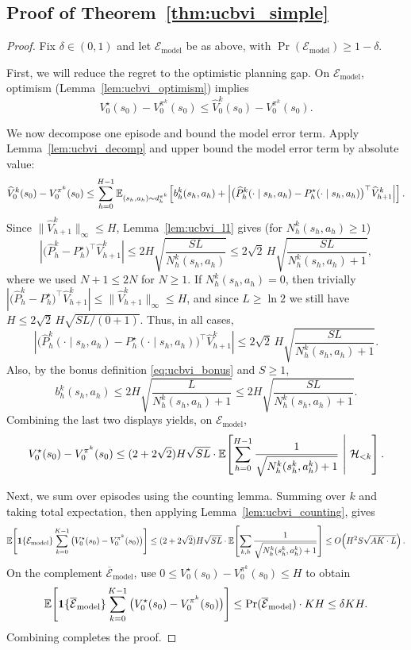 \subsection{Proof of Theorem~\ref{thm:ucbvi_simple}}

\begin{proof}
Fix $\delta\in(0,1)$ and let $\mathcal{E}_{\mathrm{model}}$ be as above, with
$\Pr(\mathcal{E}_{\mathrm{model}})\ge 1-\delta$.

First, we will reduce the regret to the optimistic planning gap.
On $\mathcal{E}_{\mathrm{model}}$, optimism (Lemma~\ref{lem:ucbvi_optimism}) implies
\[
V_0^\star(s_0) - V_0^{\pi^k}(s_0)
\le
\widehat V_0^k(s_0) - V_0^{\pi^k}(s_0).
\]

We now decompose one episode and bound the model error term.
Apply Lemma~\ref{lem:ucbvi_decomp} and upper bound the model error term by absolute value:
\[
\widehat V_0^k(s_0) - V_0^{\pi^k}(s_0)
\le
\sum_{h=0}^{H-1}\mathbb{E}_{(s_h,a_h)\sim d_h^{\pi^k}}\!\left[
b_h^k(s_h,a_h) + \left|\big(\widehat P_h^k(\cdot\mid s_h,a_h)-P_h^\star(\cdot\mid s_h,a_h)\big)^\top \widehat V_{h+1}^k\right|
\right].
\]
Since $\|\widehat V_{h+1}^k\|_\infty\le H$, Lemma~\ref{lem:ucbvi_l1} gives (for $N_h^k(s_h,a_h)\ge 1$)
\[
\left|\big(\widehat P_h^k-P_h^\star\big)^\top \widehat V_{h+1}^k\right|
\le
2H\sqrt{\frac{S L}{N_h^k(s_h,a_h)}}
\le
2\sqrt{2}\,H\sqrt{\frac{S L}{N_h^k(s_h,a_h)+1}},
\]
where we used $N+1\le 2N$ for $N\ge 1$.
If $N_h^k(s_h,a_h)=0$, then trivially
$\left|\big(\widehat P_h^k-P_h^\star\big)^\top \widehat V_{h+1}^k\right|\le \|\widehat V_{h+1}^k\|_\infty\le H$,
and since $L\ge \ln 2$ we still have
$H\le 2\sqrt{2}\,H\sqrt{SL/(0+1)}$.
Thus, in all cases,
\[
\left|\big(\widehat P_h^k(\cdot\mid s_h,a_h)-P_h^\star(\cdot\mid s_h,a_h)\big)^\top \widehat V_{h+1}^k\right|
\le
2\sqrt{2}\,H\sqrt{\frac{S L}{N_h^k(s_h,a_h)+1}}.
\]
Also, by the bonus definition \eqref{eq:ucbvi_bonus} and $S\ge 1$,
\[
b_h^k(s_h,a_h)\le 2H\sqrt{\frac{L}{N_h^k(s_h,a_h)+1}}
\le 2H\sqrt{\frac{S L}{N_h^k(s_h,a_h)+1}}.
\]
Combining the last two displays yields, on $\mathcal{E}_{\mathrm{model}}$,
\[
V_0^\star(s_0) - V_0^{\pi^k}(s_0)
\le
(2+2\sqrt{2})H\sqrt{SL}\cdot
\E\!\left[\sum_{h=0}^{H-1}\frac{1}{\sqrt{N_h^k(s_h^k,a_h^k)+1}}\ \middle|\ \Hcal_{<k}\right].
\]

Next, we sum over episodes using the counting lemma.
Summing over $k$ and taking total expectation, then applying Lemma~\ref{lem:ucbvi_counting}, gives
\[
\mathbb{E}\!\left[\mathbf{1}\{\mathcal{E}_{\mathrm{model}}\}\sum_{k=0}^{K-1}\big(V_0^\star(s_0)-V_0^{\pi^k}(s_0)\big)\right]
\le
(2+2\sqrt{2})H\sqrt{SL}\cdot
\mathbb{E}\!\left[\sum_{k,h}\frac{1}{\sqrt{N_h^k(s_h^k,a_h^k)+1}}\right]
\le
O\!\left(H^2 S\sqrt{AK\cdot L}\right).
\]
On the complement $\overline{\mathcal{E}}_{\mathrm{model}}$, use $0\le V_0^\star(s_0)-V_0^{\pi^k}(s_0)\le H$ to obtain
\[
\mathbb{E}\!\left[\mathbf{1}\{\overline{\mathcal{E}}_{\mathrm{model}}\}\sum_{k=0}^{K-1}\big(V_0^\star(s_0)-V_0^{\pi^k}(s_0)\big)\right]
\le
\Pr(\overline{\mathcal{E}}_{\mathrm{model}})\cdot KH
\le
\delta K H.
\]
Combining completes the proof.
\end{proof}

